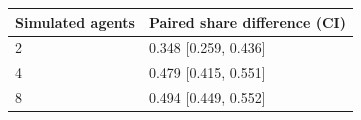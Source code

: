 \begin{center}\small\begin{tabular}{ll}\toprule
Simulated agents & Paired share difference (CI) \\\midrule
2 & 0.348 [0.259, 0.436] \\
4 & 0.479 [0.415, 0.551] \\
8 & 0.494 [0.449, 0.552] \\
\bottomrule\end{tabular}\end{center}
